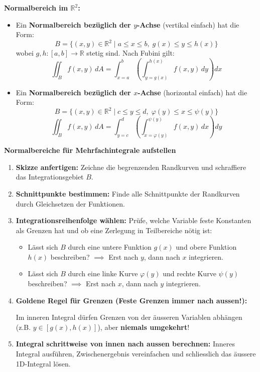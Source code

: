 \begin{definition}
    \textbf{Normalbereich im $\mathbb{R}^2$:}
    \begin{itemize}
        \item Ein \textbf{Normalbereich bezüglich der $y$-Achse} (vertikal einfach) hat die Form:
        $$ B = \{ (x, y) \in \mathbb{R}^2 \mid a \le x \le b, \; g(x) \le y \le h(x) \} $$
        wobei $g, h: [a, b] \to \mathbb{R}$ stetig sind. Nach Fubini gilt:
        $$ \iint_B f(x, y) \, dA = \int_{x=a}^b \left( \int_{y=g(x)}^{h(x)} f(x, y) \, dy \right) dx $$
        \item Ein \textbf{Normalbereich bezüglich der $x$-Achse} (horizontal einfach) hat die Form:
        $$ B = \{ (x, y) \in \mathbb{R}^2 \mid c \le y \le d, \; \varphi(y) \le x \le \psi(y) \} $$
        $$ \iint_B f(x, y) \, dA = \int_{y=c}^d \left( \int_{x=\varphi(y)}^{\psi(y)} f(x, y) \, dx \right) dy $$
    \end{itemize}
\end{definition}

\begin{example}
    \textbf{Normalbereiche für Mehrfachintegrale aufstellen}
    
    \begin{enumerate}
        \item \textbf{Skizze anfertigen:} Zeichne die begrenzenden Randkurven und schraffiere das Integrationsgebiet $B$.
        \item \textbf{Schnittpunkte bestimmen:} Finde alle Schnittpunkte der Randkurven durch Gleichsetzen der Funktionen.
        \item \textbf{Integrationsreihenfolge wählen:}
        Prüfe, welche Variable feste Konstanten als Grenzen hat und ob eine Zerlegung in Teilbereiche nötig ist:
        \begin{itemize}
            \item Lässt sich $B$ durch eine untere Funktion $g(x)$ und obere Funktion $h(x)$ beschreiben? $\implies$ Erst nach $y$, dann nach $x$ integrieren.
            \item Lässt sich $B$ durch eine linke Kurve $\varphi(y)$ und rechte Kurve $\psi(y)$ beschreiben? $\implies$ Erst nach $x$, dann nach $y$ integrieren.
        \end{itemize}
        \item \textbf{Goldene Regel für Grenzen (Feste Grenzen immer nach aussen!):}
        \begin{center}
        \end{center}
        Im inneren Integral dürfen Grenzen von der äusseren Variablen abhängen (z.B. $y \in [g(x), h(x)]$), aber \textbf{niemals umgekehrt}!
        \item \textbf{Integral schrittweise von innen nach aussen berechnen:}
        Inneres Integral ausführen, Zwischenergebnis vereinfachen und schliesslich das äussere 1D-Integral lösen.
    \end{enumerate}
\end{example}

